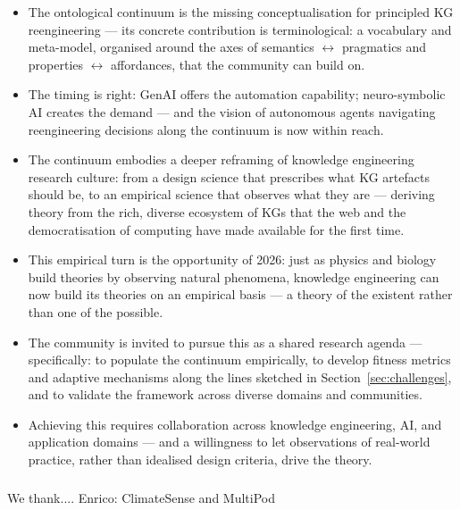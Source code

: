 \documentclass[runningheads]{llncs}
\begin{document}
\begin{itemize}
    \item The ontological continuum is the missing conceptualisation for principled KG reengineering --- its concrete contribution is terminological: a vocabulary and meta-model, organised around the axes of semantics $\leftrightarrow$ pragmatics and properties $\leftrightarrow$ affordances, that the community can build on. %
    \item The timing is right: GenAI offers the automation capability; neuro-symbolic AI creates the demand --- and the vision of autonomous agents navigating reengineering decisions along the continuum is now within reach. %
    \item The continuum embodies a deeper reframing of knowledge engineering research culture: from a design science that prescribes what KG artefacts should be, to an empirical science that observes what they are --- deriving theory from the rich, diverse ecosystem of KGs that the web and the democratisation of computing have made available for the first time. %
    \item This empirical turn is the opportunity of 2026: just as physics and biology build theories by observing natural phenomena, knowledge engineering can now build its theories on an empirical basis --- a theory of the existent rather than one of the possible. %
    \item The community is invited to pursue this as a shared research agenda --- specifically: to populate the continuum empirically, to develop fitness metrics and adaptive mechanisms along the lines sketched in Section~\ref{sec:challenges}, and to validate the framework across diverse domains and communities. %
    \item Achieving this requires collaboration across knowledge engineering, AI, and application domains --- and a willingness to let observations of real-world practice, rather than idealised design criteria, drive the theory. %
\end{itemize}

%

\begin{credits}
\subsubsection{\ackname} We thank.... Enrico: ClimateSense and MultiPod

\end{credits}
\end{document}
